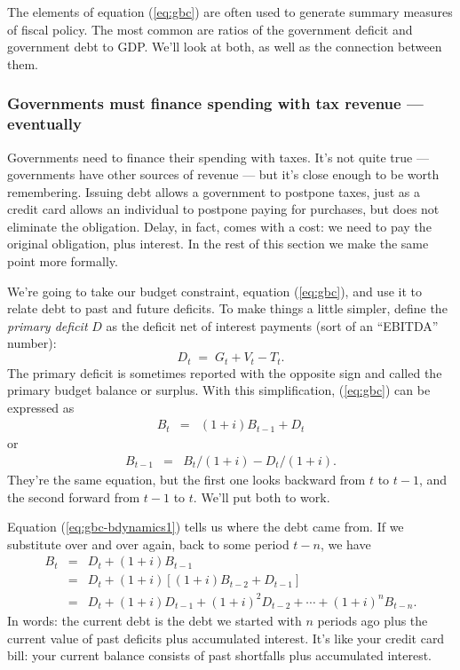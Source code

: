 \documentclass[letterpaper,12pt]{article}
\begin{document}
The elements of equation (\ref{eq:gbc})
are often used to generate summary measures
of fiscal policy.
The most common are ratios  of
the government deficit and government debt to GDP.
We'll look at both, as well as the connection between them.


\subsubsection*{Governments must finance spending with tax revenue --- eventually}


Governments need to finance their spending with taxes.
It's not quite true --- governments have other sources of revenue ---
but it's close enough to be worth remembering.
Issuing debt allows a government to postpone taxes,
just as a credit card allows an individual to postpone paying
for purchases,
but does not eliminate the obligation.
Delay, in fact, comes with a cost:  we need to pay the original
obligation, plus interest.
In the rest of this section we make the same point more formally.

We're going to take our budget constraint, equation (\ref{eq:gbc}),
and use it to relate debt to past and future deficits.
To make things a little simpler,
define the {\it primary deficit\/} $D$ as the deficit
net of interest payments (sort of an ``EBITDA'' number):
\[
    D_t \;=\;  G_t + V_t - T_t .
\]
The primary deficit is sometimes reported with the opposite
sign and called the primary budget balance or surplus.
With this simplification, (\ref{eq:gbc}) can be expressed as
\begin{eqnarray}
    B_{t}   &=& (1+i) B_{t-1} + D_t
   \label{eq:gbc-bdynamics1}
\end{eqnarray}
or
\begin{eqnarray}
    B_{t-1}  &=&  B_{t}/(1+i) - D_t/(1+i) .
    \label{eq:gbc-bdynamics2}
\end{eqnarray}
They're the same equation, but the first one looks backward from $t$ to $t-1$,
and the second forward from $t-1$ to $t$.
We'll put both to work.

Equation (\ref{eq:gbc-bdynamics1}) tells us where the debt came from.
If we substitute over and over again, back to some period $t-n$,
we have
\begin{eqnarray*}
    B_{t}  &=& D_t + (1+i) B_{t-1} \\
            &=& D_t + (1+i) [(1+i) B_{t-2} + D_{t-1}] \\
            &=& D_t + (1+i) D_{t-1} + (1+i)^2 D_{t-2} + \cdots + (1+i)^n B_{t-n}.
\end{eqnarray*}
In words:  the current debt is the debt we started with $n$ periods ago
plus the current value of past deficits plus accumulated interest.
It's like your credit card bill:
your current balance consists of past shortfalls plus accumulated interest.
\end{document}

